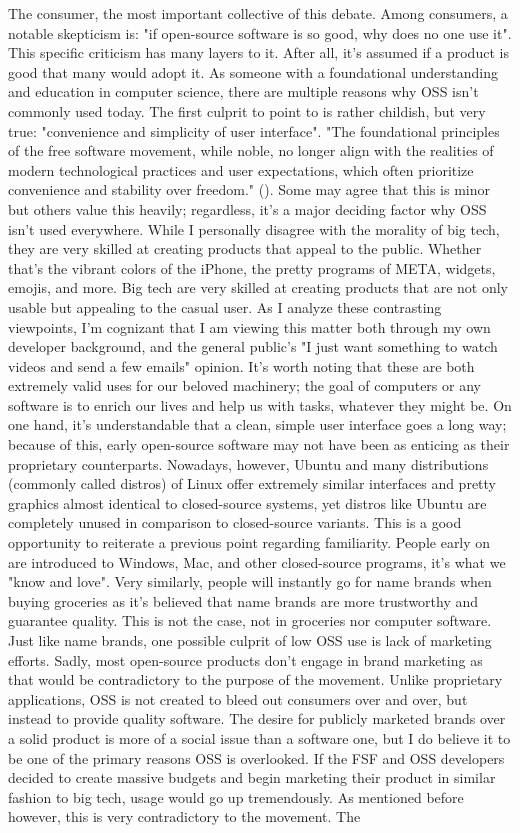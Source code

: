 \documentclass[11pt]{article}
\begin{document}
The consumer, the most important collective of this debate. Among consumers, a notable skepticism is: "if open-source software is so good, why does no one use it". This specific criticism has many layers to it. After all, it's assumed if a product is good that many would adopt it. As someone with a foundational understanding and education in computer science, there are multiple reasons why OSS isn't commonly used today. The first culprit to point to is rather childish, but very true: "convenience and simplicity of user interface". "The foundational principles of the free software movement, while noble, no longer align with the realities of modern technological practices and user expectations, which often prioritize convenience and stability over freedom." (\cite{FreeSoftwareIdea2021}). Some may agree that this is minor but others value this heavily; regardless, it's a major deciding factor why OSS isn't used everywhere. While I personally disagree with the morality of big tech, they are very skilled at creating products that appeal to the public. Whether that's the vibrant colors of the iPhone, the pretty programs of META, widgets, emojis, and more. Big tech are very skilled at creating products that are not only usable but appealing to the casual user. As I analyze these contrasting viewpoints, I'm cognizant that I am viewing this matter both through my own developer background, and the general public's "I just want something to watch videos and send a few emails" opinion. It's worth noting that these are both extremely valid uses for our beloved machinery; the goal of computers or any software is to enrich our lives and help us with tasks, whatever they might be. On one hand, it's understandable that a clean, simple user interface goes a long way; because of this, early open-source software may not have been as enticing as their proprietary counterparts. Nowadays, however, Ubuntu and many distributions (commonly called distros) of Linux offer extremely similar interfaces and pretty graphics almost identical to closed-source systems, yet distros like Ubuntu are completely unused in comparison to closed-source variants. This is a good opportunity to reiterate a previous point regarding familiarity. People early on are introduced to Windows, Mac, and other closed-source programs, it's what we "know and love". Very similarly, people will instantly go for name brands when buying groceries as it's believed that name brands are more trustworthy and guarantee quality. This is not the case, not in groceries nor computer software. Just like name brands, one possible culprit of low OSS use is lack of marketing efforts. Sadly, most open-source products don't engage in brand marketing as that would be contradictory to the purpose of the movement. Unlike proprietary applications, OSS is not created to bleed out consumers over and over, but instead to provide quality software. The desire for publicly marketed brands over a solid product is more of a social issue than a software one, but I do believe it to be one of the primary reasons OSS is overlooked. If the FSF and OSS developers decided to create massive budgets and begin marketing their product in similar fashion to big tech, usage would go up tremendously. As mentioned before however, this is very contradictory to the movement. The 
\end{document}
